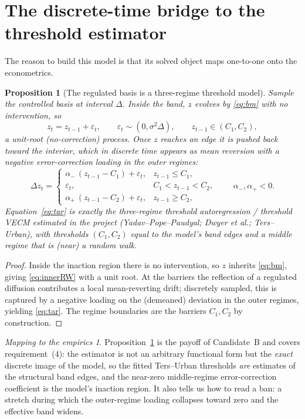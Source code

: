 \documentclass[11pt,a4paper]{article}
\theoremstyle{plain}
\newtheorem{proposition}{Proposition}
\theoremstyle{definition}
\theoremstyle{remark}
\newtheorem*{takeaway}{Mapping to the empirics}
\begin{document}
\section{The discrete-time bridge to the threshold estimator}\label{sec:bridge}
The reason to build this model is that its solved object maps one-to-one onto the econometrics.
\begin{proposition}[The regulated basis is a three-regime threshold model]\label{prop:bridge}
Sample the controlled basis at interval $\Delta$. Inside the band, $z$ evolves by \eqref{eq:bm} with no intervention, so
\begin{equation}
z_t = z_{t-1} + \varepsilon_t, \qquad \varepsilon_t\sim(0,\sigma^2\Delta), \qquad z_{t-1}\in(C_1,C_2), \label{eq:innerRW}
\end{equation}
a unit-root (no-correction) process. Once $z$ reaches an edge it is pushed back toward the interior, which in discrete time appears as mean reversion with a negative error-correction loading in the outer regimes:
\begin{equation}
\Delta z_t = \begin{cases} \alpha_{-}\,(z_{t-1}-C_1) + \varepsilon_t, & z_{t-1}\le C_1,\\[2pt] \varepsilon_t, & C_1<z_{t-1}<C_2,\\[2pt] \alpha_{+}\,(z_{t-1}-C_2) + \varepsilon_t, & z_{t-1}\ge C_2, \end{cases} \qquad \alpha_{-},\alpha_{+}<0. \label{eq:tar}
\end{equation}
Equation~\eqref{eq:tar} is exactly the three-regime threshold autoregression / threshold VECM estimated in the project (Yadav--Pope--Paudyal; Dwyer et al.; Ters--Urban), with thresholds $(C_1,C_2)$ equal to the model's band edges and a middle regime that is (near) a random walk.
\end{proposition}
\begin{proof}
Inside the inaction region there is no intervention, so $z$ inherits \eqref{eq:bm}, giving \eqref{eq:innerRW} with a unit root. At the barriers the reflection of a regulated diffusion contributes a local mean-reverting drift; discretely sampled, this is captured by a negative loading on the (demeaned) deviation in the outer regimes, yielding \eqref{eq:tar}. The regime boundaries are the barriers $C_1,C_2$ by construction.
\end{proof}

\begin{takeaway}
Proposition~\ref{prop:bridge} is the payoff of Candidate~B and covers requirement~(4): the estimator is not an arbitrary functional form but the \emph{exact} discrete image of the model, so the fitted Ters--Urban thresholds \emph{are} estimates of the structural band edges, and the near-zero middle-regime error-correction coefficient is the model's inaction region. It also tells us how to read a ban: a stretch during which the outer-regime loading collapses toward zero and the effective band widens.
\end{takeaway}
\end{document}
